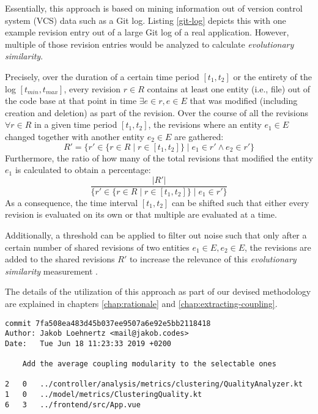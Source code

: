 \documentclass[12pt,a4paper]{report}
\begin{document}
Essentially, this approach is based on mining information out of version
control system (VCS) data such as a Git log. Listing \ref{git-log} depicts
this with one example revision entry out of a large Git log of a real
application. However, multiple of those revision entries would be analyzed to
calculate \textit{evolutionary similarity}.

Precisely, over the duration of a certain time period \([t_1, t_2]\) or the
entirety of the log \([t_{min}, t_{max}]\), every revision \(r \in R\) contains
at least one entity (i.e., file) out of the code base at that point in time
\(\exists e \in r, e \in E\) that was modified (including creation and deletion)
as part of the revision. Over the course of all the revisions \(\forall r \in
R\) in a given time period \([t_1, t_2]\), the revisions where an entity \(e_1
\in E\) changed together with another entity \(e_2 \in E\) are gathered:
\[
  R' = \{ r' \in \{ r \in R \mid r \in [t_1, t_2] \} \mid e_1 \in r' \land e_2 \in r' \}
\]
Furthermore, the ratio of how many of the total revisions that
modified the entity \(e_1\) is calculated to obtain a percentage:
\[
  \frac{\vert R' \vert}{\{ r' \in \{ r \in R \mid r \in [t_1, t_2] \} \mid e_1 \in r' \}}
\]
As a consequence, the time interval \([t_1, t_2]\) can be shifted such
that either every revision is evaluated on its own or that multiple are
evaluated at a time.

Additionally, a threshold can be applied to filter out noise such that only
after a certain number of shared revisions of two entities \(e_1 \in E, e_2 \in
E\), the revisions are added to the shared revisions \(R'\) to increase the
relevance of this \textit{evolutionary similarity} measurement
\cite{tornhill2015crimescene}.

The details of the utilization of this approach as part of our devised
methodology are explained in chapters \ref{chap:rationale} and
\ref{chap:extracting-coupling}.

\begin{lstlisting}[caption=Example Git log, label=git-log, breaklines=true]
commit 7fa508ea483d45b037ee9507a6e92e5bb2118418
Author: Jakob Loehnertz <mail@jakob.codes>
Date:   Tue Jun 18 11:23:33 2019 +0200

    Add the average coupling modularity to the selectable ones

2   0   ../controller/analysis/metrics/clustering/QualityAnalyzer.kt
1   0   ../model/metrics/ClusteringQuality.kt
6   3   ../frontend/src/App.vue
\end{lstlisting}
\end{document}
